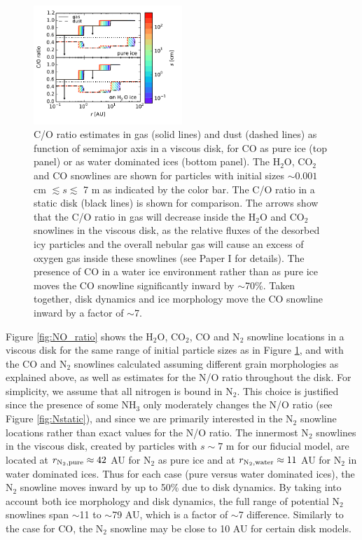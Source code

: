 \documentclass[apj]{emulateapj}
\begin{document}
\begin{figure}[h!]
\centering
\includegraphics[width=0.5\textwidth]{C_O_water_ice.pdf}
\caption{C/O ratio estimates in gas (solid lines) and dust (dashed lines) as function of semimajor axis in a viscous disk, for CO as pure ice (top panel) or as water dominated ices (bottom panel). The H$_2$O, CO$_2$ and CO snowlines are shown for particles with initial sizes $\sim0.001$ cm $\lesssim s \lesssim$ 7 m as indicated by the color bar. The C/O ratio in a static disk (black lines) is shown for comparison. The arrows show that the C/O ratio in gas will decrease inside the H$_2$O and CO$_2$
snowlines in the viscous disk, as the relative fluxes of the desorbed icy
particles and the overall nebular gas will cause an excess of oxygen gas inside these snowlines (see Paper I for details). The presence of CO in a water ice environment rather than as pure ice moves the CO snowline significantly inward by $\sim$70\%. Taken together, disk dynamics and ice morphology move the CO snowline inward by a factor of $\sim$7.} 
\label{fig:CO_ratio}
\end{figure}


Figure \ref{fig:NO_ratio} shows the H$_2$O, CO$_2$, CO and N$_2$ snowline locations in a viscous disk for the same range of initial particle sizes as in Figure \ref{fig:CO_ratio}, and with the CO and N$_2$ snowlines calculated assuming different grain morphologies as explained above, as well as estimates for the N/O ratio throughout the disk. For simplicity, we assume that all nitrogen is bound in N$_2$. This choice is justified since the presence of some NH$_3$ only moderately changes the N/O ratio (see Figure \ref{fig:Nstatic}), and since we are primarily interested in the N$_2$ snowline locations rather than exact values for the N/O ratio. The innermost N$_2$ snowlines in the viscous disk, created by particles with $s \sim 7$ m for our fiducial model, are located at $r_{\rm N_2, pure} \approx 42$ AU for N$_2$ as pure ice and at $r_{\rm N_2, water} \approx 11$ AU for N$_2$ in water dominated ices. Thus for each case (pure versus water dominated ices), the N$_2$ snowline moves inward by up to 50\% due to disk dynamics. By taking into account both ice morphology and disk dynamics, the full range of potential N$_2$ snowlines span $\sim$11 to $\sim$79 AU, which is a factor of $\sim$7 difference. Similarly to the case for CO, the N$_2$ snowline may be close to 10 AU for certain disk models. 
\end{document}
